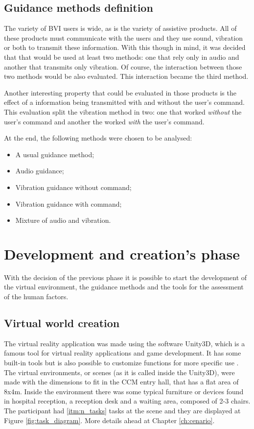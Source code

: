     \subsection{Guidance methods definition}
        The variety of BVI users is wide, as is the variety of assistive products. All of these products must communicate with the users and they use sound, vibration or both to transmit these information. With this though in mind, it was decided that that would be used at least two methods: one that rely only in audio and another that transmits only vibration. Of course, the interaction between those two methods would be also evaluated. This interaction became the third method.
        
        Another interesting property that could be evaluated in those products is the effect of a information being transmitted with and without the user's command. This evaluation split the vibration method in two: one that worked \textit{without} the user's command and another the worked \textit{with} the user's command.
        
        At the end, the following methods were chosen to be analysed:
        
        \begin{itemize}
            \item A usual guidance method;
            \item Audio guidance;
            \item Vibration guidance without command;
            \item Vibration guidance with command;
            \item Mixture of audio and vibration.
        \end{itemize}
    
\section{Development and creation's phase}
\label{sec:creation_phase}
    
    With the decision of the previous phase it is possible to start the development of the virtual environment, the guidance methods and the tools for the assessment of the human factors.

    \subsection{Virtual world creation}
    \label{subsec:virtual_world_creation}
        The virtual reality application was made using the software Unity3D, which is a famous tool for virtual reality applications and game development. It has some built-in tools but is also possible to customize functions for more specific use \cite{wang2010new}. The virtual environments, or scenes (as it is called inside the Unity3D), were made with the dimensions to fit in the CCM entry hall, that has a flat area of 8x4m. Inside the environment there was some typical furniture or devices found in hospital reception, a reception desk and a waiting area, composed of 2-3 chairs. The participant had \ref{itm:n_tasks} tasks at the scene and they are displayed at Figure \ref{fig:task_diagram}. More details ahead at Chapter \ref{ch:cenario}.
        
